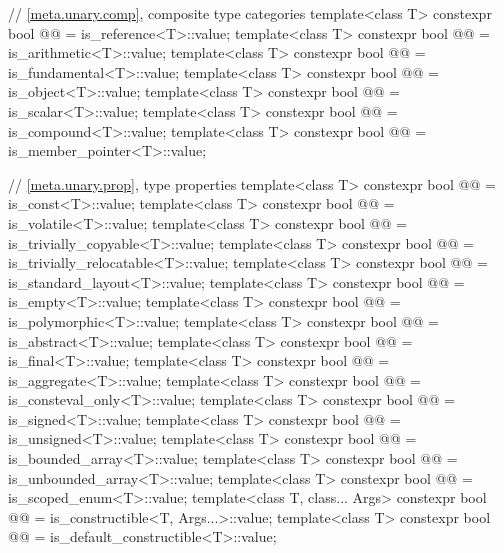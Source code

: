 \begin{codeblock}
{  // \ref{meta.unary.comp}, composite type categories
  template<class T>
    constexpr bool @@ = is_reference<T>::value;
  template<class T>
    constexpr bool @@ = is_arithmetic<T>::value;
  template<class T>
    constexpr bool @@ = is_fundamental<T>::value;
  template<class T>
    constexpr bool @@ = is_object<T>::value;
  template<class T>
    constexpr bool @@ = is_scalar<T>::value;
  template<class T>
    constexpr bool @@ = is_compound<T>::value;
  template<class T>
    constexpr bool @@ = is_member_pointer<T>::value;

  // \ref{meta.unary.prop}, type properties
  template<class T>
    constexpr bool @@ = is_const<T>::value;
  template<class T>
    constexpr bool @@ = is_volatile<T>::value;
  template<class T>
    constexpr bool @@ = is_trivially_copyable<T>::value;
  template<class T>
    constexpr bool @@ = is_trivially_relocatable<T>::value;
  template<class T>
    constexpr bool @@ = is_standard_layout<T>::value;
  template<class T>
    constexpr bool @@ = is_empty<T>::value;
  template<class T>
    constexpr bool @@ = is_polymorphic<T>::value;
  template<class T>
    constexpr bool @@ = is_abstract<T>::value;
  template<class T>
    constexpr bool @@ = is_final<T>::value;
  template<class T>
    constexpr bool @@ = is_aggregate<T>::value;
  template<class T>
    constexpr bool @@ = is_consteval_only<T>::value;
  template<class T>
    constexpr bool @@ = is_signed<T>::value;
  template<class T>
    constexpr bool @@ = is_unsigned<T>::value;
  template<class T>
    constexpr bool @@ = is_bounded_array<T>::value;
  template<class T>
    constexpr bool @@ = is_unbounded_array<T>::value;
  template<class T>
    constexpr bool @@ = is_scoped_enum<T>::value;
  template<class T, class... Args>
    constexpr bool @@ = is_constructible<T, Args...>::value;
  template<class T>
    constexpr bool @@ = is_default_constructible<T>::value;
}
\end{codeblock}
